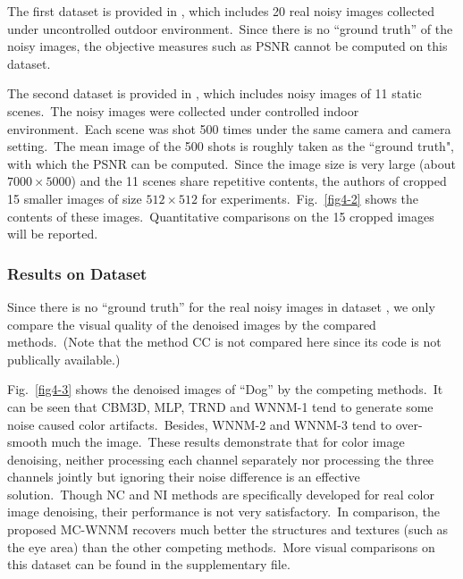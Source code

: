The first dataset is provided in \cite{ncwebsite}, which includes 20 real noisy images collected under uncontrolled outdoor environment.\ Since there is no ``ground truth'' of the noisy images, the objective measures such as PSNR cannot be computed on this dataset.

The second dataset is provided in \cite{crosschannel2016}, which includes noisy images of 11 static scenes.\ The noisy images were collected under controlled indoor environment.\ Each scene was shot 500 times under the same camera and camera setting.\ The mean image of the 500 shots is roughly taken as the ``ground truth", with which the PSNR can be computed.\ Since the image size is very large (about $7000\times5000$) and the 11 scenes share repetitive contents, the authors of \cite{crosschannel2016} cropped 15 smaller images of size $512\times512$ for experiments.\ Fig.\ \ref{fig4-2} shows the contents of these images.\ Quantitative comparisons on the 15 cropped images will be reported. 

\subsubsection{Results on Dataset \cite{ncwebsite}}

\quad Since there is no ``ground truth'' for the real noisy images in dataset \cite{ncwebsite}, we only compare the visual quality of the denoised images by the compared methods.\ (Note that the method CC \cite{crosschannel2016} is not compared here since its code is not publically available.)

Fig.\ \ref{fig4-3} shows the denoised images of ``Dog'' by the competing methods.\ It can be seen that CBM3D, MLP, TRND and WNNM-1 tend to generate some noise caused color artifacts.\ Besides, WNNM-2 and WNNM-3 tend to over-smooth much the image.\ These results demonstrate that for color image denoising, neither processing each channel separately nor processing the three channels jointly but ignoring their noise difference is an effective solution.\ Though NC and NI methods are specifically developed for real color image denoising, their performance is not very satisfactory.\ In comparison, the proposed MC-WNNM recovers much better the structures and textures (such as the eye area) than the other competing methods.\ More visual comparisons on this dataset can be found in the supplementary file.

